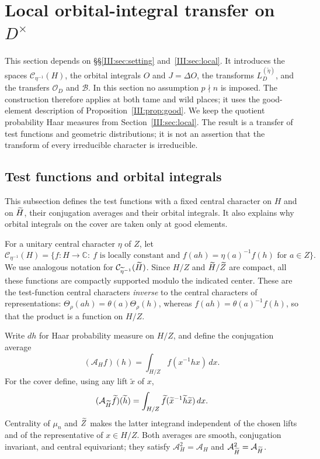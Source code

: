 \section{Local orbital-integral transfer on \texorpdfstring{$D^\times$}{D x}}\label{III:sec:orbital}
This section depends on \S\S\ref{III:sec:setting} and~\ref{III:sec:local}. It introduces the spaces $\mathcal C_{\eta^{-1}}(H)$, the orbital integrals $O$ and $J=\Delta O$, the transforms $L_D^{(\widetilde\eta)}$, and the transfers $\mathcal O_D$ and $\mathcal B$. In this section no assumption $p\nmid n$ is imposed. The construction therefore
applies at both tame and wild places; it uses the good-element description of
Proposition~\ref{III:prop:good}. We keep the quotient probability Haar measures from
Section~\ref{III:sec:local}. The result is a transfer of test functions and geometric
distributions; it is not an assertion that the transform of every irreducible
character is irreducible.

\subsection{Test functions and orbital integrals}
This subsection defines the test functions with a fixed central character on $H$ and on $\widetilde H$, their conjugation averages and their orbital integrals. It also explains why orbital integrals on the cover are taken only at good elements.

For a unitary central character $\eta$ of $Z$, let
\[
\mathcal C_{\eta^{-1}}(H)
=\{f:H\to\mathbb C:\ f\text{ is locally constant and }
                   f(ah)=\eta(a)^{-1}f(h)\text{ for }a\in Z\}.
\]
We use analogous notation for $\mathcal C_{\widetilde\eta^{-1}}(\widetilde H)$.
Since $H/Z$ and $\widetilde H/\widetilde Z$ are compact, all these functions are compactly
supported modulo the indicated center. These are the test-function central
characters \emph{inverse} to the central characters of representations:
$\Theta_\rho(ah)=\theta(a)\Theta_\rho(h)$, whereas
$f(ah)=\theta(a)^{-1}f(h)$, so that the product is a function on $H/Z$.

Write $dh$ for Haar probability measure on $H/Z$, and define the
conjugation average
\begin{equation}\label{III:eq:avg-H}
(\mathcal A_Hf)(h)
=\int_{H/Z}f(x^{-1}hx)\,dx.
\end{equation}
For the cover define, using any lift $\widetilde x$ of $x$,
\begin{equation}\label{III:eq:avg-cover}
(\mathcal A_{\widetilde H}\widetilde f)(\widetilde h)
=\int_{H/Z}\widetilde f(\widetilde x^{-1}\widetilde h\widetilde x)\,dx.
\end{equation}
Centrality of $\mu_n$ and $\widetilde Z$ makes the latter integrand independent of
the chosen lifts and of the representative of $x\in H/Z$. Both averages
are smooth, conjugation invariant, and central equivariant; they satisfy
$\mathcal A_H^2=\mathcal A_H$ and
$\mathcal A_{\widetilde H}^2=\mathcal A_{\widetilde H}$.


